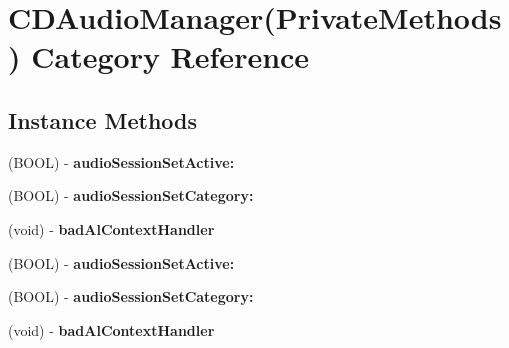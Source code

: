 \hypertarget{categoryCDAudioManager_07PrivateMethods_08}{}\section{C\+D\+Audio\+Manager(Private\+Methods) Category Reference}
\label{categoryCDAudioManager_07PrivateMethods_08}
\subsection*{Instance Methods}
\begin{DoxyCompactItemize}
\item 
\mbox{\label{categoryCDAudioManager_07PrivateMethods_08_a4b56e335717210211452776f410fe663}} 
(B\+O\+OL) -\/ {\bfseries audio\+Session\+Set\+Active\+:}
\item 
\mbox{\label{categoryCDAudioManager_07PrivateMethods_08_a6f3477c3ea17cb909c974d915aa537ff}} 
(B\+O\+OL) -\/ {\bfseries audio\+Session\+Set\+Category\+:}
\item 
\mbox{\label{categoryCDAudioManager_07PrivateMethods_08_a95773df277cf1440a70017986eba5357}} 
(void) -\/ {\bfseries bad\+Al\+Context\+Handler}
\item 
\mbox{\label{categoryCDAudioManager_07PrivateMethods_08_a4b56e335717210211452776f410fe663}} 
(B\+O\+OL) -\/ {\bfseries audio\+Session\+Set\+Active\+:}
\item 
\mbox{\label{categoryCDAudioManager_07PrivateMethods_08_a6f3477c3ea17cb909c974d915aa537ff}} 
(B\+O\+OL) -\/ {\bfseries audio\+Session\+Set\+Category\+:}
\item 
\mbox{\label{categoryCDAudioManager_07PrivateMethods_08_a95773df277cf1440a70017986eba5357}} 
(void) -\/ {\bfseries bad\+Al\+Context\+Handler}
\item 
\mbox{\label{categoryCDAudioManager_07PrivateMethods_08_a4b56e335717210211452776f410fe663}} 

\end{DoxyCompactItemize}
